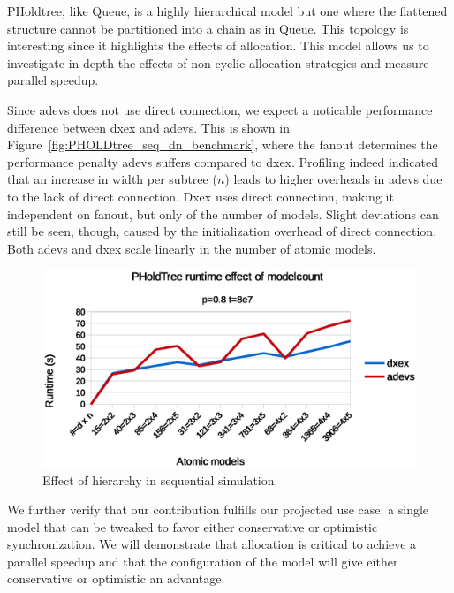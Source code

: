 PHoldtree, like Queue, is a highly hierarchical model but one where the flattened structure cannot be partitioned into a chain as in Queue.
This topology is interesting since it highlights the effects of allocation.
This model allows us to investigate in depth the effects of non-cyclic allocation strategies and measure parallel speedup.

Since adevs does not use direct connection, we expect a noticable performance difference between dxex and adevs.
This is shown in Figure~\ref{fig:PHOLDtree_seq_dn_benchmark}, where the fanout determines the performance penalty adevs suffers compared to dxex.
Profiling indeed indicated that an increase in width per subtree ($n$) leads to higher overheads in adevs due to the lack of direct connection.
Dxex uses direct connection, making it independent on fanout, but only of the number of models.
Slight deviations can still be seen, though, caused by the initialization overhead of direct connection.
Both adevs and dxex scale linearly in the number of atomic models.

\begin{figure}
    \center
    \includegraphics[width=\plotfraction\columnwidth]{fig/pholdtree_sequential_dn.eps}
    \caption{Effect of hierarchy in sequential simulation.}
    \label{fig:PHoldtree_seq_dn_benchmark}
\end{figure}

We further verify that our contribution fulfills our projected use case: a single model that can be tweaked to favor either conservative or optimistic synchronization. We will demonstrate that allocation is critical to achieve a parallel speedup and that the configuration of the model will give either conservative or optimistic an advantage.
